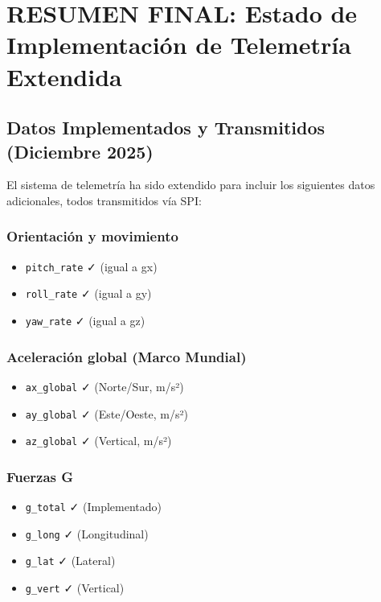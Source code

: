 \documentclass[11pt,a4paper]{article}
\begin{document}
\newpage
\section{RESUMEN FINAL: Estado de Implementación de Telemetría Extendida}

\subsection{Datos Implementados y Transmitidos (Diciembre 2025)}

El sistema de telemetría ha sido extendido para incluir los siguientes datos adicionales, todos transmitidos vía SPI:

\subsubsection{Orientación y movimiento}
\begin{itemize}
    \item \texttt{pitch\_rate} ✓ (igual a gx)
    \item \texttt{roll\_rate} ✓ (igual a gy)
    \item \texttt{yaw\_rate} ✓ (igual a gz)
\end{itemize}

\subsubsection{Aceleración global (Marco Mundial)}
\begin{itemize}
    \item \texttt{ax\_global} ✓ (Norte/Sur, m/s²)
    \item \texttt{ay\_global} ✓ (Este/Oeste, m/s²)
    \item \texttt{az\_global} ✓ (Vertical, m/s²)
\end{itemize}

\subsubsection{Fuerzas G}
\begin{itemize}
    \item \texttt{g\_total} ✓ (Implementado)
    \item \texttt{g\_long} ✓ (Longitudinal)
    \item \texttt{g\_lat} ✓ (Lateral)
    \item \texttt{g\_vert} ✓ (Vertical)
\end{itemize}
\end{document}
